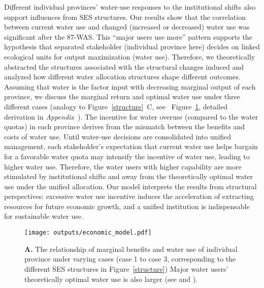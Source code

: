 \label{discussion-2}
Different individual provinces' water-use responses to the institutional shifts also support influences from SES structures.
Our results show that the correlation between current water use and changed (increased or decreased) water use was significant after the 87-WAS.
This ``major users use more'' pattern supports the hypothesis that separated stakeholder (individual province here) decides on linked ecological units for output maximization (water use).
Therefore, we theoretically abstracted the structures associated with the structural changes induced and analyzed how different water allocation structures shape different outcomes.
Assuming that water is the factor input with decreasing marginal output of each province, we discuss the marginal return and optimal water use under three different cases (analogy to Figure~\ref{structure}~C, see ~Figure~\ref{fig:model}, detailed derivation in \textit{Appendix~}).
The incentive for water overuse (compared to the water quotas) in each province derives from the mismatch between the benefits and costs of water use.
Until water-use decisions are consolidated into unified management, each stakeholder’s expectation that current water use helps bargain for a favorable water quota may intensify the incentive of water use, leading to higher water use.
Therefore, the water users with higher capability are more stimulated by institutional shifts and away from the theoretically optimal water use under the unified allocation.
Our model interprets the results from structural perspectives: excessive water use incentive induces the acceleration of extracting resources for future economic growth, and a unified institution is indispensable for sustainable water use.

\begin{figure}[!ht]
    \centering
    \texttt{[image: outputs/economic\_model.pdf]}
	\caption{
		\textbf{A.} The relationship of marginal benefits and water use of individual province under varying cases (case 1 to case 3, corresponding to the different SES structures in Figure~\ref{structure}) Major water users' theoretically optimal water use is also larger (see  and \textit{}).}
	\label{fig:model}
\end{figure}

